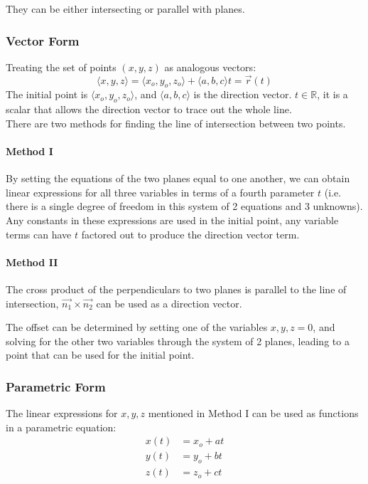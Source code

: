 \documentclass{article}
\newcommand{\vect}[1]{\ensuremath{\overrightarrow{#1}}}
\begin{document}
They can be either intersecting or parallel with planes.

\subsubsection{Vector Form}
Treating the set of points $(x,y,z)$ as analogous vectors:
$$\langle x, y, z \rangle = \langle x_o, y_o, z_o \rangle + \langle a, b, c \rangle t = \vect{r}(t)$$
The initial point is $\langle x_o, y_o, z_o \rangle$, and $\langle a,b,c \rangle$ is the direction vector. $t \in \mathbb{R}$, it is a scalar that allows the direction vector to trace out the whole line.\\
There are two methods for finding the line of intersection between two points.
\paragraph{Method I} By setting the equations of the two planes equal to one another, we can obtain linear expressions for all three variables in terms of a fourth parameter $t$ (i.e. there is a single degree of freedom in this system of 2 equations and 3 unknowns). Any constants in these expressions are used in the initial point, any variable terms can have $t$ factored out to produce the direction vector term.

\paragraph{Method II} The cross product of the perpendiculars to two planes is parallel to the line of intersection, $\vect{n_1} \times \vect{n_2}$ can be used as a direction vector.

The offset can be determined by setting one of the variables $x, y, z = 0$, and solving for the other two variables through the system of 2 planes, leading to a point that can be used for the initial point.

\subsubsection{Parametric Form}
The linear expressions for $x,y,z$ mentioned in Method I can be used as functions in a parametric equation:
\begin{align*}
    x(t) &= x_o + at \\
    y(t) &= y_o + bt \\
    z(t) &= z_o + ct
\end{align*}
\end{document}
